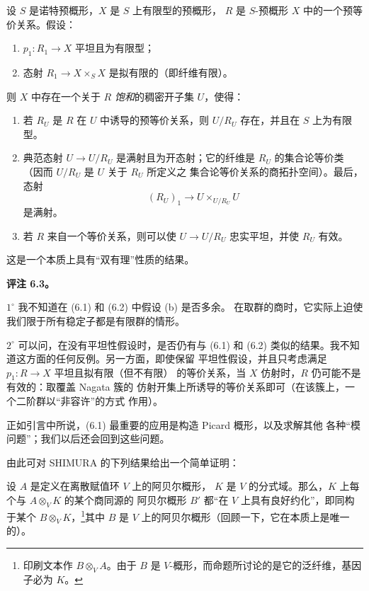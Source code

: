  设 $S$ 是诺特预概形，$X$ 是 $S$ 上有限型的预概形，
$R$ 是 $S$-预概形 $X$ 中的一个预等价关系。假设：
\begin{enumerate}
\item[(a)] $p_1:R_1\to X$ 平坦且为有限型；
\item[(b)] 态射 $R_1\to X\times_S X$ 是拟有限的（即纤维有限）。
\end{enumerate}
则 $X$ 中存在一个关于 $R$ \emph{饱和}的稠密开子集 $U$，使得：
\begin{enumerate}
\item[(i)] 若 $R_U$ 是 $R$ 在 $U$ 中诱导的预等价关系，则 $U/R_U$
存在，并且在 $S$ 上为有限型。

\item[(ii)] 典范态射 $U\to U/R_U$ 是满射且为开态射；它的纤维是
$R_U$ 的集合论等价类（因而 $U/R_U$ 是 $U$ 关于 $R_U$ 所定义之
集合论等价关系的商拓扑空间）。最后，态射
\[
  (R_U)_1\longrightarrow U\times_{U/R_U}U
\]
是满射。

\item[(iii)] 若 $R$ 来自一个等价关系，则可以使
$U\to U/R_U$ 忠实平坦，并使 $R_U$ 有效。
\end{enumerate}

这是一个本质上具有“双有理”性质的结果。

\medskip
\noindent\textbf{评注 6.3。}

\smallskip
\noindent $1^\circ$ 我不知道在 (6.1) 和 (6.2) 中假设 (b) 是否多余。
在取群的商时，它实际上迫使我们限于所有稳定子都是有限群的情形。

\smallskip
\noindent $2^\circ$ 可以问，在没有平坦性假设时，是否仍有与 (6.1)
和 (6.2) 类似的结果。我不知道这方面的任何反例。另一方面，即使保留
平坦性假设，并且只考虑满足 $p_1:R\to X$ 平坦且拟有限（但不有限）
的等价关系，当 $X$ 仿射时，$R$ 仍可能不是有效的：取覆盖 Nagata 簇的
仿射开集上所诱导的等价关系即可（在该簇上，一个二阶群以“非容许”的方式
作用）。


正如引言中所说，(6.1) 最重要的应用是构造 Picard 概形，以及求解其他
各种“模问题”；我们以后还会回到这些问题。

由此可对 SHIMURA 的下列结果给出一个简单证明：

 设 $A$ 是定义在离散赋值环 $V$ 上的阿贝尔概形，
$K$ 是 $V$ 的分式域。那么，$K$ 上每个与 $A\otimes_V K$ 的某个商同源的
阿贝尔概形 $B'$ 都“在 $V$ 上具有良好约化”，即同构于某个
$B\otimes_V K$，\footnote{印刷文本作 $B\otimes_V A$。由于 $B$ 是
$V$-概形，而命题所讨论的是它的泛纤维，基因子必为 $K$。}其中 $B$ 是
$V$ 上的阿贝尔概形（回顾一下，它在本质上是唯一的）。

